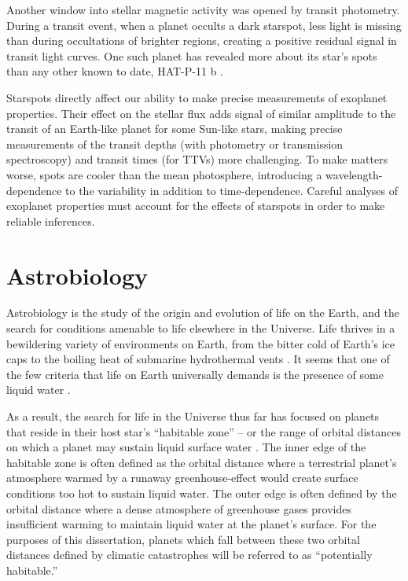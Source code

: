 Another window into stellar magnetic activity was opened by \kepler transit photometry. During a transit event, when a planet occults a dark starspot, less light is missing than during occultations of brighter regions, creating a positive residual signal in transit light curves. One such planet has revealed more about its star's spots than any other known to date, HAT-P-11 b \citep{Bakos2010,Winn2010,Deming2011,Sanchis-Ojeda2011,Hirano2011}.

Starspots directly affect our ability to make precise measurements of exoplanet properties. Their effect on the stellar flux adds signal of similar amplitude to the transit of an Earth-like planet for some Sun-like stars, making precise measurements of the transit depths (with photometry or transmission spectroscopy) and transit times (for TTVs) more challenging. To make matters worse, spots are cooler than the mean photosphere, introducing a wavelength-dependence to the variability in addition to time-dependence. Careful analyses of exoplanet properties must account for the effects of starspots in order to make reliable inferences. 

\section{Astrobiology} \label{sec:ab}

Astrobiology is the study of the origin and evolution of life on the Earth, and the search for conditions amenable to life elsewhere in the Universe. Life thrives in a bewildering variety of environments on Earth, from the bitter cold of Earth's ice caps to the boiling heat of submarine hydrothermal vents \citep{Rothschild2001,Cavicchioli2002}. It seems that one of the few criteria that life on Earth universally demands is the presence of some liquid water \citep{DesMarais2002}. 

As a result, the search for life in the Universe thus far has focused on planets that reside in their host star's ``habitable zone'' -- or the range of orbital distances on which a planet may sustain liquid surface water \citep[e.g.][]{Huang1959,Kasting1993,Kopparapu2013}. The inner edge of the habitable zone is often defined as the orbital distance where a terrestrial planet's atmosphere warmed by a runaway greenhouse-effect would create surface conditions too hot to sustain liquid water. The outer edge is often defined by the orbital distance where a dense atmosphere of greenhouse gases provides insufficient warming to maintain liquid water at the planet's surface.
For the purposes of this dissertation, planets which fall between these two orbital distances defined by climatic catastrophes will be referred to as ``potentially habitable.'' 

